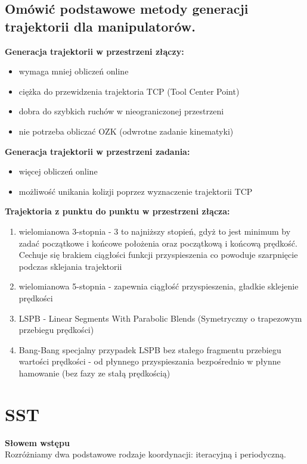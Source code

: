 \subsection{Omówić podstawowe metody generacji trajektorii dla manipulatorów.}
\textbf{Generacja trajektorii w przestrzeni złączy:}
\begin{itemize}
    \item wymaga mniej obliczeń online
    \item ciężka do przewidzenia trajektoria TCP (Tool Center Point)
    \item dobra do szybkich ruchów w nieograniczonej przestrzeni
    \item nie potrzeba obliczać OZK (odwrotne zadanie kinematyki)
\end{itemize}

\textbf{Generacja trajektorii w przestrzeni zadania:}
\begin{itemize}
    \item więcej obliczeń online
    \item możliwość unikania kolizji poprzez wyznaczenie trajektorii TCP
\end{itemize}

\textbf{Trajektoria z punktu do punktu w przestrzeni złącza:}
\begin{enumerate}
    \item wielomianowa 3-stopnia - 3 to najniższy stopień, gdyż to jest minimum by zadać początkowe i końcowe położenia oraz początkową i końcową prędkość. Cechuje się brakiem ciągłości funkcji przyspieszenia co powoduje szarpnięcie podczas sklejania trajektorii
    \item wielomianowa 5-stopnia - zapewnia ciągłość przyspieszenia, gładkie sklejenie prędkości
    \item LSPB - Linear Segments With Parabolic Blends (Symetryczny o trapezowym przebiegu prędkości)
    \item Bang-Bang specjalny przypadek LSPB bez stałego fragmentu przebiegu wartości prędkości - od płynnego przyspieszania bezpośrednio w płynne hamowanie (bez fazy ze stałą prędkością)
\end{enumerate}

\section{SST}
\textbf{Słowem wstępu}\\
Rozróżniamy dwa podstawowe rodzaje koordynacji: iteracyjną i periodyczną.

